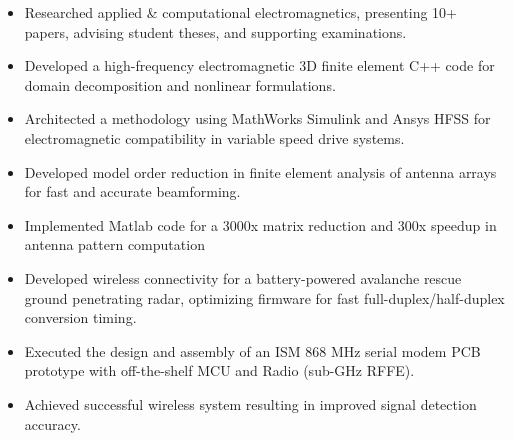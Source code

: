 \documentclass[9pt,a4paper,ragged2e,withhyper]{altacv} %
\begin{document}
\begin{paracol}{2}
\begin{itemize}
\item Researched applied \& computational electromagnetics, presenting 10+ papers, advising student theses, and supporting examinations.
\item Developed a high-frequency electromagnetic 3D finite element C++ code for domain decomposition and nonlinear formulations.
\item Architected a methodology using MathWorks Simulink and Ansys HFSS for electromagnetic compatibility in variable speed drive systems.
\end{itemize}

\divider

\begin{itemize}
\item Developed model order reduction in finite element analysis of antenna arrays for fast and accurate beamforming.
\item Implemented Matlab code for a 3000x matrix reduction and 300x speedup in antenna pattern computation
\end{itemize}
\divider

\begin{itemize}
\item Developed wireless connectivity for a battery-powered avalanche rescue ground penetrating radar, optimizing firmware for fast full-duplex/half-duplex conversion timing.
\item Executed the design and assembly of an ISM 868 MHz serial modem PCB prototype with off-the-shelf MCU and Radio (sub-GHz RFFE).
\item Achieved successful wireless system resulting in improved signal detection accuracy.
\end{itemize}


\end{paracol}
\end{document}
